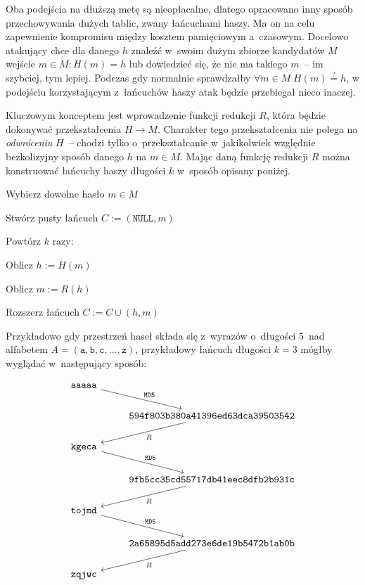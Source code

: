 Oba podejścia na dłuższą metę są nieopłacalne, dlatego opracowano inny sposób
przechowywania dużych tablic, zwany łańcuchami haszy. Ma on na celu zapewnienie
kompromisu między kosztem pamięciowym a~czasowym. Docelowo atakujący chce dla
danego $h$ znaleźć w~swoim dużym zbiorze kandydatów $M$ wejście $m \in M : H(m)
= h$ lub dowiedzieć się, że nie ma takiego $m$~-- im szybciej, tym lepiej.
Podczas gdy normalnie sprawdzałby $\forall m \in M \; H(m) \stackrel{?}{=} h$,
w podejściu korzystającym z~łańcuchów haszy atak będzie przebiegał nieco
inaczej.

Kluczowym konceptem jest wprowadzenie funkcji redukcji $R$, która będzie
dokonywać przekształcenia $H \to M$. Charakter tego przekształcenia nie polega
na \emph{odwróceniu} $H$~-- chodzi tylko o~przekształcanie w~jakikolwiek
względnie bezkolizyjny sposób danego $h$ na $m \in M$. Mając daną funkcję
redukcji $R$ można konstruować łańcuchy haszy długości $k$ w~sposób opisany
poniżej.

\begin{myenumerate}

    \item Wybierz dowolne hasło $m \in M$

    \item Stwórz pusty łańcuch $C := (\texttt{NULL}, m)$

    \item Powtórz $k$ razy:

    \begin{myenumerate}

        \item Oblicz $h := H(m)$

        \item Oblicz $m := R(h)$

        \item Rozszerz łańcuch $C := C \cup (h, m)$

    \end{myenumerate}

\end{myenumerate}

Przykładowo gdy przestrzeń haseł składa się z~wyrazów o~długości 5~nad
alfabetem $A = (\mathtt{a}, \mathtt{b}, \mathtt{c}, \ldots, \mathtt{z})$,
przykładowy łańcuch długości $k=3$ mógłby wyglądać w~następujący sposób:

\[
\begin{tikzcd}
    \mathtt{aaaaa} \arrow{rd}{\mathtt{MD5}} & \\
    & \arrow{ld}{R} \mathtt{594f803b380a41396ed63dca39503542} \\
    \mathtt{kgeca} \arrow{rd}{\mathtt{MD5}} & \\
    & \arrow{ld}{R} \mathtt{9fb5cc35cd55717db41eec8dfb2b931c} \\
    \mathtt{tojmd} \arrow{rd}{\mathtt{MD5}} & \\
    & \arrow{ld}{R} \mathtt{2a65895d5add273e6de19b5472b1ab0b} \\
    \mathtt{zqjwc}
\end{tikzcd}
\]

